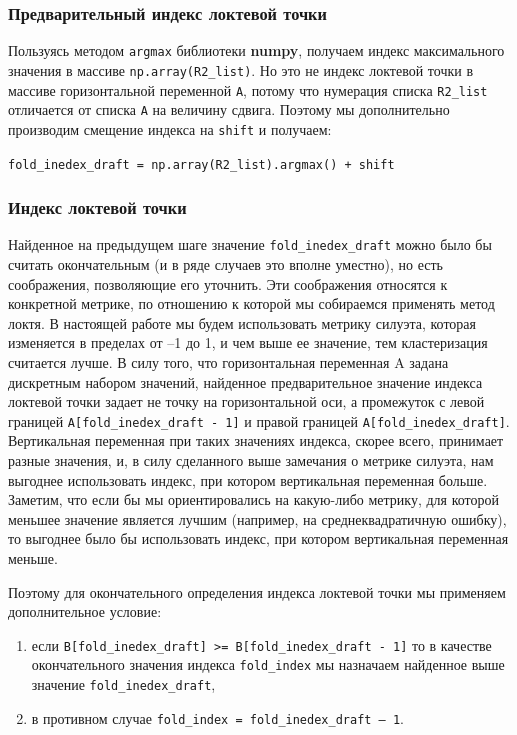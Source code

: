 \documentclass[a4paper,12pt]{article}
\begin{document}
\subsubsection{Предварительный индекс локтевой точки}
 
Пользуясь методом \texttt{argmax} библиотеки \textbf{numpy}, получаем индекс максимального значения в массиве \texttt{np.array(R2\_list)}. Но это не индекс локтевой точки в массиве горизонтальной переменной \texttt{A}, потому что нумерация списка \texttt{R2\_list} отличается от списка \texttt{A} на величину сдвига. Поэтому мы дополнительно производим смещение индекса на \texttt{shift} и получаем:


\medskip\noindent
\texttt{fold\_inedex\_draft = np.array(R2\_list).argmax() + shift}


\subsubsection{Индекс локтевой точки}

Найденное на предыдущем шаге значение \texttt{fold\_inedex\_draft} можно было бы считать окончательным (и в ряде случаев это вполне уместно), но есть соображения, позволяющие его уточнить. Эти соображения относятся к конкретной метрике, по отношению к которой мы собираемся применять метод локтя. В настоящей работе мы будем использовать метрику силуэта, которая изменяется в пределах от –1 до 1, и чем выше ее значение, тем кластеризация считается лучше. В силу того, что горизонтальная переменная A задана дискретным набором значений, найденное предварительное значение индекса локтевой точки задает не точку на горизонтальной оси, а промежуток с левой границей \texttt{A[fold\_inedex\_draft - 1]} и правой границей \texttt{A[fold\_inedex\_draft]}. Вертикальная переменная при таких значениях индекса, скорее всего, принимает разные значения, и, в силу сделанного выше замечания о метрике силуэта, нам выгоднее использовать индекс, при котором вертикальная переменная больше. Заметим, что если бы мы ориентировались на какую-либо метрику, для которой меньшее значение является лучшим (например, на среднеквадратичную ошибку), то выгоднее было бы использовать индекс, при котором вертикальная переменная меньше. 

Поэтому для окончательного определения индекса локтевой точки мы применяем дополнительное условие:


\medskip\noindent
\begin{enumerate}
	\item если \texttt{B[fold\_inedex\_draft] >= B[fold\_inedex\_draft - 1]} то в качестве окончательного значения индекса \texttt{fold\_index} мы назначаем найденное выше значение \texttt{fold\_inedex\_draft},
	\item в противном случае \texttt{fold\_index = fold\_inedex\_draft – 1}.
\end{enumerate}
\end{document}
